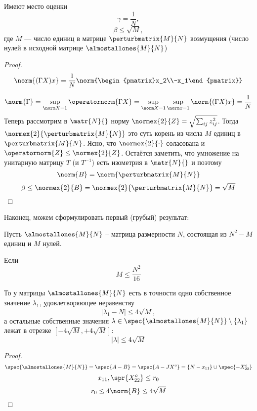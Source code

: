 \begin{lemma}
    Имеют место оценки
    \[ \gamma = \frac1N ,\]
    \[ \beta \leq \sqrt{M} ,\]
    где \( M \) --- число единиц в матрице \( \perturbmatrix{M}{N} \) возмущения
    (число нулей в исходной матрице \( \almostallones{M}{N} \))
\end{lemma}
\begin{proof}
    \[ \norm{(\Gamma X) x} = \frac1N \norm{\begin{pmatrix}x_2\\-x_1\end{pmatrix}} \]

    \[
        \norm{\Gamma} = \sup_{\norm X = 1} \operatornorm{\Gamma X}
        = \sup_{\norm X = 1} \sup_{\norm x = 1} \norm{(\Gamma X)x} = \frac1N
        \]
    Теперь рассмотрим в \( \matr{N}{} \) норму
    \( \normex{2}{Z} = \sqrt{\sum_{ij} z_{ij}^2} \).
    Тогда \( \normex{2}{\perturbmatrix{M}{N}} \)
    это суть корень из числа \( M \) единиц в \( \perturbmatrix{M}{N} \).
    Ясно, что \( \normex{2}{\cdot} \) соласована и \( \operatornorm{Z} \leq \normex{2}{Z} \).
    Остаётся заметить, что умножение на унитарную матрицу \( T \)
    (и \( T^{-1} \)) есть изометрия
    в \( \matr{N}{} \)
    и поэтому
    \[ \norm{B} = \norm{\perturbmatrix{M}{N}} \]
    \[ \beta \leq \normex{2}{B} = \normex{2}{\perturbmatrix{M}{N}} = \sqrt{M} \]
\end{proof}

Наконец, можем сформулировать первый (грубый) результат:
\begin{thm}
    Пусть \( \almostallones{M}{N} \) -- матрица размерности \( N \),
    состоящая из \( N^2 - M \) единиц и \( M \) нулей.

    Если
    \[
        M \leq \frac{N^2}{16}
        \]

    То у матрицы \( \almostallones{M}{N} \) есть в точности одно собственное
    значение \( \lambda_1 \), удовлетворяющее неравенству
    \[ \lvert \lambda_1 - N \rvert \leq 4\sqrt{M} ,\]
    а остальные собственные значения \( \lambda\in\spec{\almostallones{M}{N}} \setminus \{\lambda_1\} \)
    лежат в отрезке \( \left[-4\sqrt{M},+4\sqrt{M}\right] \):
    \[ \lvert \lambda \rvert \leq 4\sqrt{M} \]
\end{thm}
\begin{proof}
    \[
        \spec{\almostallones{M}{N}} = \spec{A-B} = \spec{A - JX^o}
        = \{ N - x_{11} \} \cup \spec{-X^o_{22}}
        \]
    \[ x_{11}, \spr{X^o_{22}} \leq r_0 \]
    \[ r_0 \leq 4\norm{B} \leq 4\sqrt{M} \]
\end{proof}
